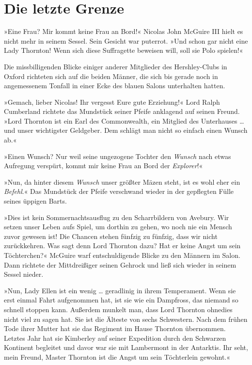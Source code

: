 \section{Die letzte Grenze}

»Eine Frau? Mir kommt keine Frau an Bord!« Nicolas John McGuire III
hielt es nicht mehr in seinem Sessel. Sein Gesicht war puterrot.
»Und schon gar nicht eine Lady Thornton! Wenn sich diese
Suffragette beweisen will, soll sie Polo spielen!«

Die missbilligenden Blicke einiger anderer Mitglieder des
Hershley-Clubs in Oxford richteten sich auf die beiden Männer, die
sich bis gerade noch in angemessenem Tonfall in einer Ecke des
blauen Salons unterhalten hatten.

»Gemach, lieber Nicolas! Ihr vergesst Eure gute Erziehung!« Lord
Ralph Cumberland richtete das Mundstück seiner Pfeife anklagend auf
seinen Freund. »Lord Thornton ist ein Earl des Commonwealth, ein
Mitglied des Unterhauses … und unser wichtigster Geldgeber. Dem
schlägt man nicht so einfach einen Wunsch ab.«

»Einen Wunsch? Nur weil seine ungezogene Tochter den \emph{Wunsch}
nach etwas Aufregung verspürt, kommt mir keine Frau an Bord der
\emph{Explorer}!«

»Nun, da hinter diesem \emph{Wunsch} unser größter Mäzen steht, ist
es wohl eher ein \emph{Befehl}.« Das Mundstück der Pfeife
verschwand wieder in der gepflegten Fülle seines üppigen Barts.

»Dies ist kein Sommernachtsausflug zu den Scharrbildern von
Avebury. Wir setzen unser Leben aufs Spiel, um dorthin zu gehen, wo
noch nie ein Mensch zuvor gewesen ist! Die Chancen stehen fünfzig
zu fünfzig, dass wir nicht zurückkehren. Was sagt denn Lord
Thornton dazu? Hat er keine Angst um sein Töchterchen?« McGuire
warf entschuldigende Blicke zu den Männern im Salon. Dann richtete
der Mittdreißiger seinen Gehrock und ließ sich wieder in seinem
Sessel nieder.

»Nun, Lady Ellen ist ein wenig … geradlinig in ihrem Temperament.
Wenn sie erst einmal Fahrt aufgenommen hat, ist sie wie ein
Dampfross, das niemand so schnell stoppen kann. Außerdem munkelt
man, dass Lord Thornton ohnedies nicht viel zu sagen hat. Sie ist
die Älteste von sechs Schwestern. Nach dem frühen Tode ihrer Mutter
hat sie das Regiment im Hause Thornton übernommen. Letztes Jahr hat
sie Kimberley auf seiner Expedition durch den Schwarzen Kontinent
begleitet und davor war sie mit Lambermont in der Antarktis. Ihr
seht, mein Freund, Master Thornton ist die Angst um sein
Töchterlein gewohnt.«

